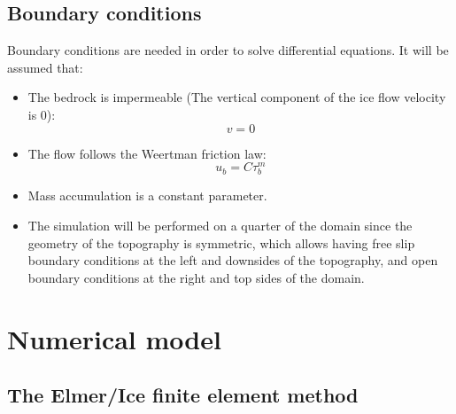 \documentclass{article}
\begin{document}
\subsection{Boundary conditions}
Boundary conditions are needed in order to solve differential equations. It will be assumed that:
\begin{itemize}
	\item The bedrock is impermeable (The vertical component of the ice flow velocity is 0):
	\begin{equation}
		v = 0
	\end{equation}
	\item The flow follows the Weertman friction law:
	\begin{equation}
		u_b = C\tau_b^m
	\end{equation}
	\item Mass accumulation is a constant parameter.
	\item The simulation will be performed on a quarter of the domain since the geometry of the topography is symmetric, which allows having free slip boundary conditions at the left and downsides of the topography, and open boundary conditions at the right and top sides of the domain. 
\end{itemize}

 \section{Numerical model}
 \subsection{The Elmer/Ice finite element method}
\end{document}
